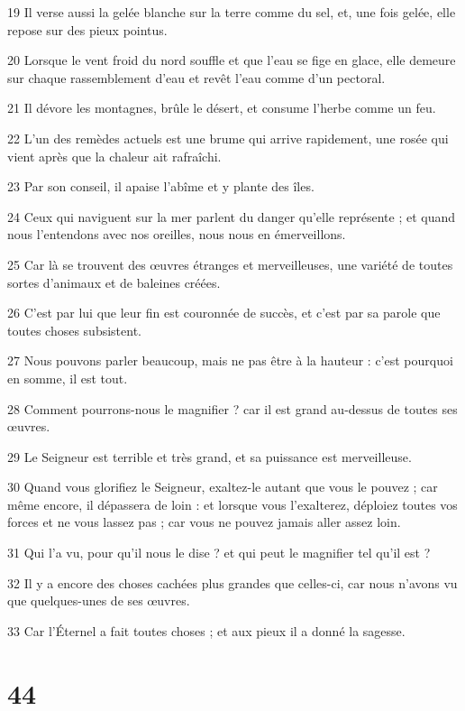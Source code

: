 \par 19 Il verse aussi la gelée blanche sur la terre comme du sel, et, une fois gelée, elle repose sur des pieux pointus.
\par 20 Lorsque le vent froid du nord souffle et que l'eau se fige en glace, elle demeure sur chaque rassemblement d'eau et revêt l'eau comme d'un pectoral.
\par 21 Il dévore les montagnes, brûle le désert, et consume l'herbe comme un feu.
\par 22 L'un des remèdes actuels est une brume qui arrive rapidement, une rosée qui vient après que la chaleur ait rafraîchi.
\par 23 Par son conseil, il apaise l'abîme et y plante des îles.
\par 24 Ceux qui naviguent sur la mer parlent du danger qu'elle représente ; et quand nous l'entendons avec nos oreilles, nous nous en émerveillons.
\par 25 Car là se trouvent des œuvres étranges et merveilleuses, une variété de toutes sortes d'animaux et de baleines créées.
\par 26 C'est par lui que leur fin est couronnée de succès, et c'est par sa parole que toutes choses subsistent.
\par 27 Nous pouvons parler beaucoup, mais ne pas être à la hauteur : c'est pourquoi en somme, il est tout.
\par 28 Comment pourrons-nous le magnifier ? car il est grand au-dessus de toutes ses œuvres.
\par 29 Le Seigneur est terrible et très grand, et sa puissance est merveilleuse.
\par 30 Quand vous glorifiez le Seigneur, exaltez-le autant que vous le pouvez ; car même encore, il dépassera de loin : et lorsque vous l'exalterez, déploiez toutes vos forces et ne vous lassez pas ; car vous ne pouvez jamais aller assez loin.
\par 31 Qui l'a vu, pour qu'il nous le dise ? et qui peut le magnifier tel qu'il est ?
\par 32 Il y a encore des choses cachées plus grandes que celles-ci, car nous n'avons vu que quelques-unes de ses œuvres.
\par 33 Car l'Éternel a fait toutes choses ; et aux pieux il a donné la sagesse.

\chapter{44}

